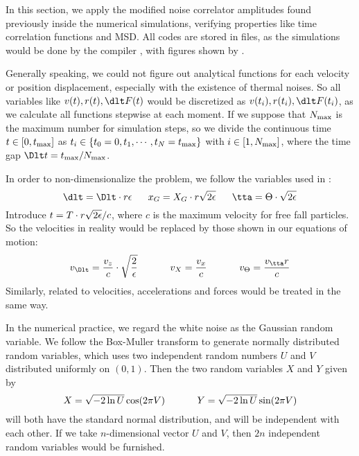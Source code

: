 \documentclass[fleqn,10pt]{InternshipReport-ENS-PSL}
\begin{document}
In this section, we apply the modified noise correlator amplitudes found previously inside the numerical simulations, verifying properties like time correlation functions and MSD.
All codes are stored in  files, as the simulations would be done by the compiler , with figures shown by .



\label{Discretisation algorithm}

Generally speaking, we could not figure out analytical functions for each velocity or position displacement, especially with the existence of thermal noises. So all variables like $v(t), r(t), \dlt F(t)$ would be discretized as $v(t_i), r(t_i), \dlt F(t_i)$, as we calculate all functions stepwise at each moment. If we suppose that $N_{\mathrm{max}}$ is the maximum number for simulation steps, so we divide the continuous time $t \in [ 0 , t_{\mathrm{max}} ]$ as $t_i \in \{ t_0 = 0, t_1, \cdots, t_{N} = t_{\mathrm{max}} \}$ with $i \in [ 1 , N_{\mathrm{max}} ]$, where the time gap $\Dlt t = t_{\mrm{max}} / N_{\mrm{max}}$. %



In order to non-dimensionalize the problem, we follow the variables used in \cite{JFM2015}:
$$ \dlt = \Dlt \cdot r \eps \fives x_G = X_G \cdot r \sqrt{2\eps} \fives \tta = \Theta \cdot \sqrt{2\eps} $$
Introduce $t = T \cdot r \sqrt{2\epsilon} / c$, where $c$ is the maximum velocity for free fall particles. So the velocities in reality would be replaced by those shown in our equations of motion:
$$ v_\Dlt = \frac{v_z}{c} \cdot \sqrt{\frac{2}{\eps}} \tens v_X = \frac{v_x}{c} \tens v_\Theta = \frac{v_\tta r}{c} $$
Similarly, related to velocities, accelerations and forces would be treated in the same way.




In the numerical practice, we regard the white noise as the Gaussian random variable. We follow the Box-Muller transform to generate normally distributed random variables, which uses two independent random numbers $U$ and $V$ distributed uniformly on $(0,1)$. Then the two random variables $X$ and $Y$ given by
$$ X = \sqrt{-2\ln U} \cos(2\pi V) \ \ \ \ \ \ \ \ \ \  Y = \sqrt{-2\ln U} \sin(2\pi V) $$
will both have the standard normal distribution, and will be independent with each other. If we take $n$-dimensional vector $U$ and $V$, then $2n$ independent random variables would be furnished. %
\end{document}

